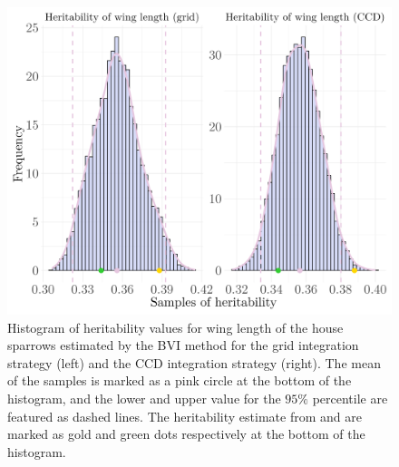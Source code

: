 \begin{figure}[ht]
  \centering
  \includegraphics[width=0.7\linewidth]{Figures/House sparrow study/Heritability_wing_combined.png}
  \caption[Estimated heritability of wing length]{Histogram of heritability values for wing length of the house sparrows estimated by the BVI method for the grid integration strategy (left) and the CCD integration strategy (right). The mean of the samples is marked as a pink circle at the bottom of the histogram, and the lower and upper value for the $95\%$ percentile are featured as dashed lines. The heritability estimate from \citet{Silva2017} and \citet{Muff2019Genetic} are marked as gold and green dots respectively at the bottom of the histogram.}
  \label{fig:heritability_wing_combined_grid_ccd}
\end{figure}

